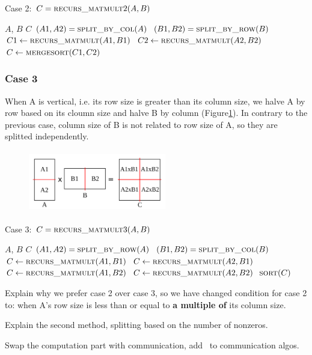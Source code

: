 \begin{algorithm}[H] 
  \caption{Case 2: $C = \textsc{recurs\_matmult}2(A, B)$} \label{alg:case2} 
  \begin{algorithmic}[1]
    \Require $A$, $B$
    \Ensure  $C$
    \State $(A1, A2) = \textsc{split\_by\_col}(A)$
    \State $(B1, B2) = \textsc{split\_by\_row}(B)$
    \State $C1 \leftarrow \textsc{recurs\_matmult}(A1,B1)$
    \State $C2 \leftarrow \textsc{recurs\_matmult}(A2,B2)$
    \State $C \leftarrow \textsc{mergesort}(C1, C2)$
  \end{algorithmic}
\end{algorithm}

\subsubsection{Case 3}
\label{sec:case3}
When A is vertical, i.e. its row size is greater than its column size, we halve A by row based on its cloumn size and halve B by column (Figure\ref{fig:case3}). In contrary to the previous case, column size of B is not related to row size of A, so they are splitted independently.

\begin{figure}[tbh]
 \centering
 \includegraphics[width=6cm,height=2.7cm]{./figures/case3_001.pdf}
 \caption{}
 \label{fig:case3}
\end{figure}

\begin{algorithm}[H] 
  \caption{Case 3: $C = \textsc{recurs\_matmult}3(A, B)$} \label{alg:case3} 
  \begin{algorithmic}[1]
    \Require $A$, $B$
    \Ensure  $C$
    \State $(A1, A2) = \textsc{split\_by\_row}(A)$
    \State $(B1, B2) = \textsc{split\_by\_col}(B)$
    \State $C \leftarrow \textsc{recurs\_matmult}(A1,B1)$
    \State $C \leftarrow \textsc{recurs\_matmult}(A2,B1)$
    \State $C \leftarrow \textsc{recurs\_matmult}(A1,B2)$
    \State $C \leftarrow \textsc{recurs\_matmult}(A2,B2)$
    \State $\textsc{sort}(C)$
  \end{algorithmic}
\end{algorithm}

Explain why we prefer case 2 over case 3, so we have changed condition for case 2 to: when A's row size is less than or equal to \textbf{a multiple of} its column size.

Explain the second method, splitting based on the number of nonzeros.

Swap the computation part with communication, add \recmm ~to communication algos.
